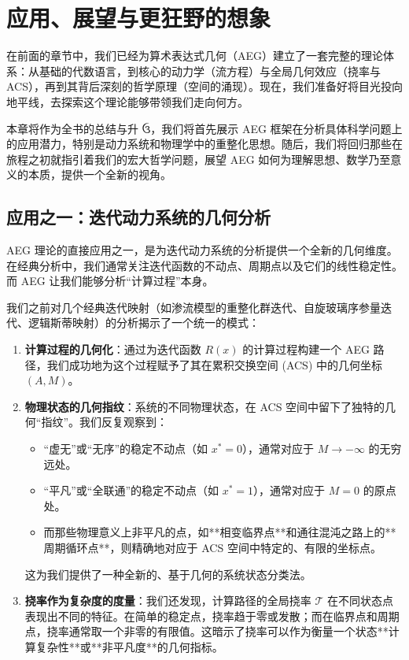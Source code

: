 \documentclass[a4paper,12pt]{book}
\numberwithin{problem}{section}
\numberwithin{definition}{section}
\numberwithin{lemma}{section}
\numberwithin{proposition}{section}
\numberwithin{theorem}{section}
\numberwithin{grammar}{section}
\numberwithin{program}{section}
\numberwithin{convention}{section}
\numberwithin{corollary}{section}
\begin{document}
\chapter{应用、展望与更狂野的想象}
\label{chap:applications_and_imaginings}

在前面的章节中，我们已经为算术表达式几何（AEG）建立了一套完整的理论体系：从基础的代数语言，到核心的动力学（流方程）与全局几何效应（挠率与ACS），再到其背后深刻的哲学原理（空间的涌现）。现在，我们准备好将目光投向地平线，去探索这个理论能够带领我们走向何方。

本章将作为全书的总结与升 ઉ，我们将首先展示 AEG 框架在分析具体科学问题上的应用潜力，特别是动力系统和物理学中的重整化思想。随后，我们将回归那些在旅程之初就指引着我们的宏大哲学问题，展望 AEG 如何为理解思想、数学乃至意义的本质，提供一个全新的视角。

\section{应用之一：迭代动力系统的几何分析}
\label{sec:app_dynamical_systems}

AEG 理论的直接应用之一，是为迭代动力系统的分析提供一个全新的几何维度。在经典分析中，我们通常关注迭代函数的不动点、周期点以及它们的线性稳定性。而 AEG 让我们能够分析“计算过程”本身。

我们之前对几个经典迭代映射（如渗流模型的重整化群迭代、自旋玻璃序参量迭代、逻辑斯蒂映射）的分析揭示了一个统一的模式：
\begin{enumerate}
    \item \textbf{计算过程的几何化}：通过为迭代函数 $R(x)$ 的计算过程构建一个 AEG 路径，我们成功地为这个过程赋予了其在累积交换空间 (ACS) 中的几何坐标 $(A,M)$。
    \item \textbf{物理状态的几何指纹}：系统的不同物理状态，在 ACS 空间中留下了独特的几何“指纹”。我们反复观察到：
    \begin{itemize}
        \item “虚无”或“无序”的稳定不动点（如 $x^*=0$），通常对应于 $M \to -\infty$ 的无穷远处。
        \item “平凡”或“全联通”的稳定不动点（如 $x^*=1$），通常对应于 $M=0$ 的原点处。
        \item 而那些物理意义上非平凡的点，如**相变临界点**和通往混沌之路上的**周期循环点**，则精确地对应于 ACS 空间中特定的、有限的坐标点。
    \end{itemize}
    这为我们提供了一种全新的、基于几何的系统状态分类法。
    \item \textbf{挠率作为复杂度的度量}：我们还发现，计算路径的全局挠率 $\mathcal{T}$ 在不同状态点表现出不同的特征。在简单的稳定点，挠率趋于零或发散；而在临界点和周期点，挠率通常取一个非零的有限值。这暗示了挠率可以作为衡量一个状态**计算复杂性**或**非平凡度**的几何指标。
\end{enumerate}
\end{document}
